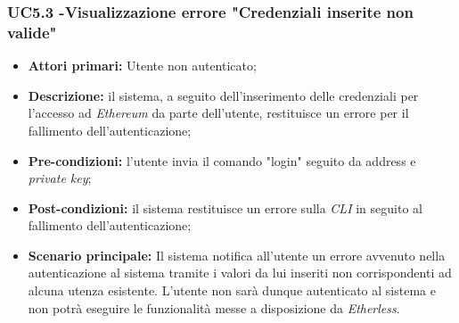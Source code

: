 \subsubsection{UC5.3 -Visualizzazione errore "Credenziali inserite non valide"}
\begin{itemize}
	\item \textbf{Attori primari:} Utente non autenticato;
	\item \textbf{Descrizione:} il sistema, a seguito dell'inserimento delle credenziali per l'accesso ad \textit{Ethereum\glo} da parte dell'utente, restituisce un errore per il fallimento dell'autenticazione; 
	\item \textbf{Pre-condizioni:} l'utente invia il comando "login" seguito da address e \textit{private key\glos};
	\item \textbf{Post-condizioni:} il sistema restituisce un errore sulla \textit{CLI\glo} in seguito al fallimento dell'autenticazione;
	\item \textbf{Scenario principale:} Il sistema notifica all'utente un errore avvenuto nella autenticazione al sistema tramite i valori da lui inseriti non corrispondenti ad alcuna utenza esistente. L'utente non sarà dunque autenticato al sistema e non potrà eseguire le funzionalità messe a disposizione da \textit{Etherless}.
\end{itemize}